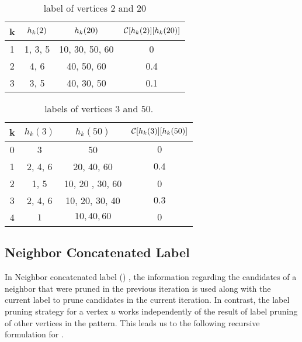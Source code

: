 \begin{table}[h]
    \centering
    \begin{tabular}{|c|c|c|c|}
        \hline
        k & $h_{k}(2)$ & $h_{k}(20)$ & $\mathcal{C}[h_{k}(2)][h_{k}(20)]$\\
        \hline
        1 & 1, 3, 5 & 10, 30, 50, 60 & 0 \\
        2 & 4, 6 & 40, 50, 60 & 0.4 \\
        3 & 3, 5 & 40, 30, 50 & 0.1\\
        \hline
    \end{tabular}
    \caption{\khop label of vertices $2$ and $20$}
    \label{tab:khop220}
\end{table}

\begin{table}[h]
    \centering
    \begin{tabular}{|c|c|c|c|}
        \hline
        k & $h_k(3)$ & $h_k(50)$ & $\mathcal{C}[h_{k}(3)][h_{k}(50)]$ \\
        \hline
        0 & 3 & 50 & $0$\\
        1 & 2, 4, 6 & 20, 40, 60 & $0.4$ \\
        2 & 1, 5 & 10, 20 , 30, 60 & 0\\
        3 & 2, 4, 6 & 10, 20, 30, 40 & $0.3$ \\
        4 & $1$ & $10, 40, 60$ & $0$ \\
        \hline
    \end{tabular}
    \caption{\khop labels of vertices $3$ and $50$.}
    \label{tab:khop350}
\end{table}



\subsection{Neighbor Concatenated Label} In Neighbor concatenated label (\ncl) ,
the information regarding the candidates of a neighbor that were pruned in the
previous iteration is used along with the current \khop label to prune
candidates in the current iteration. In contrast, the \khop label pruning
strategy for a vertex $u$ works independently of the result of \khop label
pruning of other vertices in the pattern. This leads us to the following
recursive formulation for \ncl.

